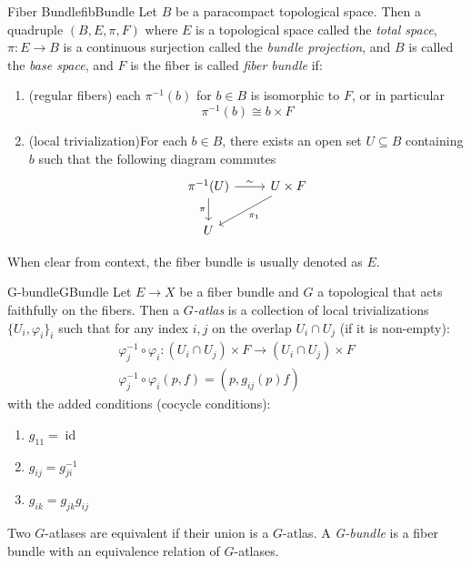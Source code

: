 \documentclass{book}
\newcommand{\sse}{\subseteq}
\renewcommand{\phi}{\varphi}
\newcommand{\id}{{\operatorname{id}}}
\begin{document}
\begin{defn}{Fiber Bundle}{fibBundle}
	Let $B$ be a paracompact topological space. Then a quadruple $(B, E, \pi, F)$ where $E$ is
	a topological space called the \emph{total space}, $\pi: E \to B$ is a continuous surjection called the
	\emph{bundle projection}, and $B$ is called the \emph{base space}, and $F$ is the fiber is called
	\emph{fiber bundle} if:
	\begin{enumerate}
		\item (regular fibers) each $\pi^{-1}(b)$ for $b \in B$ is isomorphic to $F$, or in particular
			\[
				\pi^{-1}(b) \cong b\times F
			\]
		\item (local trivialization)For each $ b\in B$, there exists an open set $U \sse B$ containing $b$ such that the following
			diagram commutes
			\[
				\begin{tikzcd}
				\pi^{-1}(U) \arrow[r, "\sim"] \arrow[d, "\pi"'] & U\times F \arrow[ld, "\pi_1"] \\
				U                                               &
				\end{tikzcd}
			\]
	\end{enumerate}
	When clear from context, the fiber bundle is usually denoted as $E$.
\end{defn}

\begin{defn}{G-bundle}{GBundle}
  Let $E \to X$ be a fiber bundle and $G$ a topological that acts faithfully on the fibers. Then
  a \emph{$G$-atlas} is a collection of local trivializations $\{U_i, \phi_i\}_i$ such that for any index
  $i,j$ on the overlap $U_i\cap U_j$ (if it is non-empty):
  \begin{gather*}
    \phi_j^{-1}\circ \phi_i: (U_i\cap U_j)\times F \to (U_i\cap U_j) \times F \\
    \phi_j^{-1}\circ\phi_i(p, f) = (p, g_{ij}(p)f)
  \end{gather*}
  with the added conditions (cocycle conditions):
  \begin{enumerate}
    \item $g_{11} = \id$
    \item $g_{ij} = g_{ji}^{-1}$
    \item $g_{ik} = g_{jk}g_{ij}$
  \end{enumerate}
  Two $G$-atlases are equivalent if their union is a $G$-atlas. A \emph{G-bundle} is a fiber bundle with an
  equivalence relation of $G$-atlases.
\end{defn}
\end{document}
